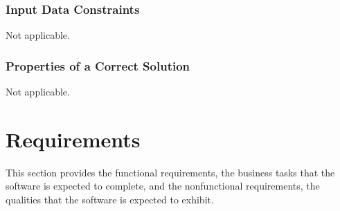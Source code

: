 \documentclass[12pt]{article}
\begin{document}
\subsubsection{Input Data Constraints} \label{sec_DataConstraints}    
Not applicable.

\subsubsection{Properties of a Correct Solution} \label{sec_CorrectSolution} Not
applicable.


\newpage


\section{Requirements}

This section provides the functional requirements, the business tasks that the
software is expected to complete, and the nonfunctional requirements, the
qualities that the software is expected to exhibit.
\end{document}
